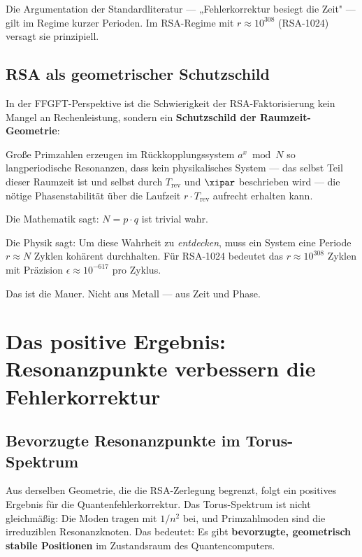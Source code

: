 Die Argumentation der Standardliteratur — „Fehlerkorrektur besiegt die Zeit" —
gilt im Regime kurzer Perioden. Im RSA-Regime mit $r \approx 10^{308}$ (RSA-1024)
versagt sie prinzipiell.

\subsection{RSA als geometrischer Schutzschild}

In der FFGFT-Perspektive ist die Schwierigkeit der RSA-Faktorisierung kein
Mangel an Rechenleistung, sondern ein \textbf{Schutzschild der Raumzeit-Geometrie}:

Große Primzahlen erzeugen im Rückkopplungssystem $a^x \bmod N$ so
langperiodische Resonanzen, dass kein physikalisches System — das selbst Teil
dieser Raumzeit ist und selbst durch $T_\text{rev}$ und $\xipar$ beschrieben wird
— die nötige Phasenstabilität über die Laufzeit $r \cdot T_\text{rev}$ aufrecht
erhalten kann.

\begin{conclusionBox}
Die Mathematik sagt: $N = p \cdot q$ ist trivial wahr.

Die Physik sagt: Um diese Wahrheit zu \emph{entdecken}, muss ein System eine
Periode $r \approx N$ Zyklen kohärent durchhalten. Für RSA-1024 bedeutet das
$r \approx 10^{308}$ Zyklen mit Präzision $\epsilon \approx 10^{-617}$ pro Zyklus.

Das ist die Mauer. Nicht aus Metall — aus Zeit und Phase.
\end{conclusionBox}


\section{Das positive Ergebnis: Resonanzpunkte verbessern die Fehlerkorrektur}

\subsection{Bevorzugte Resonanzpunkte im Torus-Spektrum}

Aus derselben Geometrie, die die RSA-Zerlegung begrenzt, folgt ein positives
Ergebnis für die Quantenfehlerkorrektur. Das Torus-Spektrum ist nicht gleichmäßig:
Die Moden tragen mit $1/n^2$ bei, und Primzahlmoden sind die irreduziblen
Resonanzknoten. Das bedeutet: Es gibt \textbf{bevorzugte, geometrisch stabile
Positionen} im Zustandsraum des Quantencomputers.


